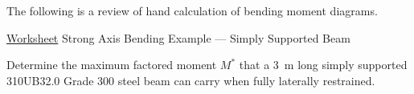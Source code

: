 The following is a review of hand calculation of bending moment diagrams.
\begin{figure}[H]\scriptsize
\centering
\end{figure}

\begin{exmp}\href{run:./WORKSHEET/CH05/EX5.BSSB.sm}{Worksheet}
Strong Axis Bending Example --- Simply Supported Beam

Determine the maximum factored moment $M^*$ that a \SI{3}{\meter} long simply supported 310UB32.0 Grade 300 steel beam can carry when fully laterally restrained.
\begin{figure}[H]

\end{figure}
\end{exmp}
